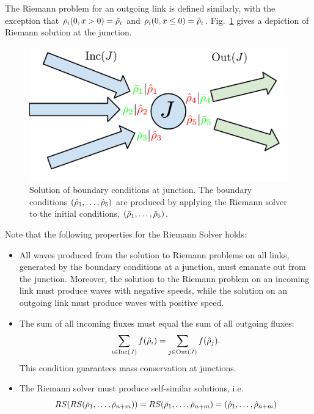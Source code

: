 The Riemann problem for an outgoing link is defined similarly, with
the exception that $\cvar_{\link}\left(0,x>0\right)=\initstate_{\link}$
and $\cvar_{\link}\left(0,x\le0\right)=\trace{\cvar}_{\link}$. Fig.~\ref{fig:Solution-of-boundary}
gives a depiction of Riemann solution at the junction.%
\begin{figure}
\begin{centering}
\includegraphics[width=0.5\columnwidth]{presentation/figs-gen/junctions-riemann-rs} 
\par\end{centering}

\caption{Solution of boundary conditions at junction. The boundary conditions
$\tuple{\trace{\cvar}_{1}}{\trace{\cvar}_{5}}$ are produced by applying
the Riemann solver to the initial conditions, $\tuple{\initstate_{1}}{\initstate_{5}}$.\label{fig:Solution-of-boundary}}
\end{figure}


Note that the following properties for the Riemann Solver holds:
\begin{itemize}
\item All waves produced from the solution to Riemann problems on all links,
generated by the boundary conditions at a junction, must emanate out
from the junction. Moreover, the solution to the Riemann problem
on an incoming link must produce waves with negative speeds, while
the solution on an outgoing link must produce waves with positive
speed. 
\item The sum of all incoming fluxes must equal the sum of all outgoing
fluxes: 
\[
\sum_{i\in\Inc\left(\jn\right)}f\left(\trace{\cvar}_{\link}\right)=\sum_{j\in\Out\left(\jn\right)}f\left(\trace{\cvar}_{j}\right).
\]
This condition guarantees mass conservation at junctions.
\item The Riemann solver must produce self-similar solutions, i.e. 
\[
\RS\left(\RS\tuple{\initstate_{1}}{\initstate_{\ninc+\nout}}\right)=\RS\tuple{\initstate_{1}}{\initstate_{\ninc+\nout}}=\tuple{\trace{\cvar}_{1}}{\trace{\cvar}_{\ninc+\nout}}
\]
\end{itemize}

